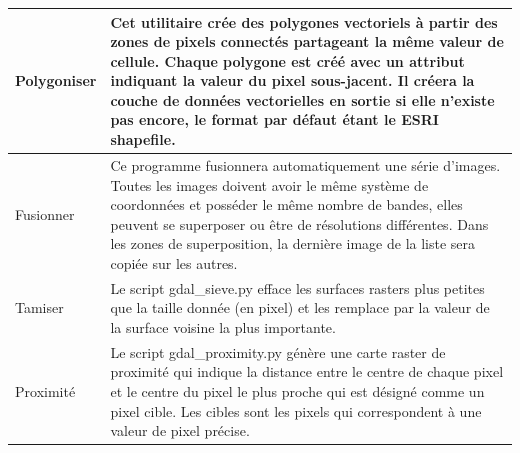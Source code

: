 {\begin{longtable}{|p{3cm}|p{13cm}|}
\hline Polygoniser & Cet utilitaire crée des polygones vectoriels à partir des zones de pixels connectés partageant la même valeur de cellule. Chaque polygone est créé avec un attribut indiquant la valeur du pixel sous-jacent. Il créera la couche de données vectorielles en sortie si elle n'existe pas encore, le format par défaut étant le ESRI shapefile. \\
\hline Fusionner & Ce programme fusionnera automatiquement une série d'images. Toutes les images doivent avoir le même système de coordonnées et posséder le même nombre de bandes, elles peuvent se superposer ou être de résolutions différentes. Dans les zones de superposition, la dernière image de la liste sera copiée sur les autres.\\
\hline Tamiser & Le script gdal\_sieve.py efface les surfaces rasters plus petites que la taille donnée (en pixel) et les remplace par la valeur de la surface voisine la plus importante.\\
\hline Proximité & Le script gdal\_proximity.py génère une carte raster de proximité qui indique la distance entre le centre de chaque pixel et le centre du pixel le plus proche qui est désigné comme un pixel cible. Les cibles sont les pixels qui correspondent à une valeur de pixel précise.\\

\end{longtable}}
